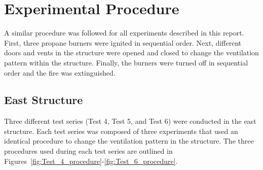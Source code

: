 \documentclass[12pt,oneside]{book}
\begin{document}
\chapter{Experimental Procedure}
\label{chap:Experimental_Procedure}
A similar procedure was followed for all experiments described in this report. First, three propane burners were ignited in sequential order. Next, different doors and vents in the structure were opened and closed to change the ventilation pattern within the structure. Finally, the burners were turned off in sequential order and the fire was extinguished. 

\section{East Structure}
\label{sec:East_exps}
Three different test series (Test 4, Test 5, and Test 6) were conducted in the east structure. Each test series was composed of three experiments that used an identical procedure to change the ventilation pattern in the structure. The three procedures used during each test series are outlined in Figures~\ref{fig:Test_4_procedure}-\ref{fig:Test_6_procedure}.

\end{document}
